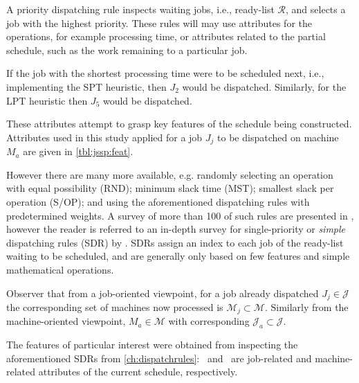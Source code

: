 \documentclass[smallextended]{svjour3}
\begin{document}
	A priority dispatching rule inspects waiting jobs, i.e., ready-list $\mathcal{R}$, and selects a job with the highest priority. These rules will may use attributes for the operations, for example processing time, or attributes related to the partial schedule, such as the work remaining to a particular job. 
	
	If the job with the shortest processing time were to be scheduled next, i.e., implementing the SPT heuristic, then $J_2$ would be dispatched. Similarly, for the LPT heuristic then $J_5$ would be dispatched. 
	
	
	
	These attributes attempt to grasp key features of the schedule being constructed. Attributes used in this study applied for a job $J_j$ to be dispatched on machine $M_a$ are given in \cref{tbl:jssp:feat}.  
	
	However there are many more available, e.g. randomly selecting an operation with equal possibility (RND); minimum slack time (MST); smallest slack per operation (S/OP); and using the aforementioned dispatching rules with predetermined weights. A survey of more than 100 of such rules are presented in \citet{Panwalkar77}, however the reader is referred to an in-depth survey for single-priority or \emph{simple} dispatching rules (SDR) by \citet{Haupt89}. 
	SDRs assign an index to each job of the ready-list waiting to be scheduled, and are generally only based on few features and simple mathematical operations. 
	
	Observer that from a job-oriented viewpoint, for a job already dispatched $J_j\in\mathcal{J}$ the corresponding set of machines now processed is $\mathcal{M}_j\subset\mathcal{M}$. Similarly from the machine-oriented viewpoint, $M_a\in\mathcal{M}$ with corresponding $\mathcal{J}_a\subset\mathcal{J}$. 
	
	The features of particular interest were obtained from inspecting the aforementioned SDRs from \cref{ch:dispatchrules}:  
	\phiJobRelated\ and \phiMacRelated\ are job-related and machine-related attributes of the current schedule, respectively. 
	
\end{document}
